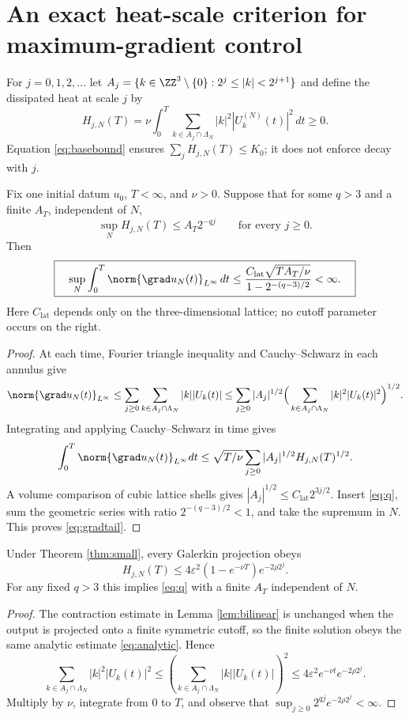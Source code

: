 \section{An exact heat-scale criterion for maximum-gradient control}
For $j=0,1,2,\ldots$ let $A_j=\{k\in\ZZ^3\setminus\{0\}:2^j\le|k|<2^{j+1}\}$ and define the dissipated heat at scale $j$ by
\begin{equation}\label{eq:Hj}
H_{j,N}(T)=\nu\int_0^T\sum_{k\in A_j\cap\Lambda_N}|k|^2|U_k^{(N)}(t)|^2\,dt\ge0.
\end{equation}
Equation \eqref{eq:basebound} ensures $\sum_jH_{j,N}(T)\le K_0$; it does not enforce decay with $j$.
\begin{theorem}\label{thm:heattail}
Fix one initial datum $u_0$, $T<\infty$, and $\nu>0$. Suppose that for some $q>3$ and a finite $A_T$, independent of $N$,
\begin{equation}\label{eq:q}
\sup_N H_{j,N}(T)\le A_T2^{-qj}\qquad\text{for every }j\ge0.
\end{equation}
Then
\begin{equation}\label{eq:gradtail}
\boxed{\quad\sup_N\int_0^T\norm{\grad u_N(t)}_{L^\infty}\,dt
\le\frac{C_{\mathrm{lat}}\sqrt{T A_T/\nu}}{1-2^{-(q-3)/2}}<\infty.\quad}
\end{equation}
Here $C_{\mathrm{lat}}$ depends only on the three-dimensional lattice; no cutoff parameter occurs on the right.
\end{theorem}
\begin{proof}
At each time, Fourier triangle inequality and Cauchy--Schwarz in each annulus give
\[
\norm{\grad u_N(t)}_{L^\infty}\le\sum_{j\ge0}\sum_{k\in A_j\cap\Lambda_N}|k||U_k(t)|
\le\sum_{j\ge0}|A_j|^{1/2}
\Big(\sum_{k\in A_j\cap\Lambda_N}|k|^2|U_k(t)|^2\Big)^{1/2}.
\]
Integrating and applying Cauchy--Schwarz in time gives
\[
\int_0^T\norm{\grad u_N(t)}_{L^\infty}dt
\le\sqrt{T/\nu}\sum_{j\ge0}|A_j|^{1/2}H_{j,N}(T)^{1/2}.
\]
A volume comparison of cubic lattice shells gives $|A_j|^{1/2}\le C_{\mathrm{lat}}2^{3j/2}$. Insert \eqref{eq:q}, sum the geometric series with ratio $2^{-(q-3)/2}<1$, and take the supremum in $N$. This proves \eqref{eq:gradtail}.
\end{proof}
\begin{corollary}\label{cor:analytictail}
Under Theorem \ref{thm:small}, every Galerkin projection obeys
\begin{equation}\label{eq:analyticH}
H_{j,N}(T)\le4\varepsilon^2(1-e^{-\nu T})e^{-2\rho2^j}.
\end{equation}
For any fixed $q>3$ this implies \eqref{eq:q} with a finite $A_T$ independent of $N$.
\end{corollary}
\begin{proof}
The contraction estimate in Lemma \ref{lem:bilinear} is unchanged when the output is projected onto a finite symmetric cutoff, so the finite solution obeys the same analytic estimate \eqref{eq:analytic}. Hence
\[
\sum_{k\in A_j\cap\Lambda_N}|k|^2|U_k(t)|^2
\le\left(\sum_{k\in A_j\cap\Lambda_N}|k||U_k(t)|\right)^2
\le4\varepsilon^2e^{-\nu t}e^{-2\rho2^j}.
\]
Multiply by $\nu$, integrate from $0$ to $T$, and observe that $\sup_{j\ge0}2^{qj}e^{-2\rho2^j}<\infty$.
\end{proof}

